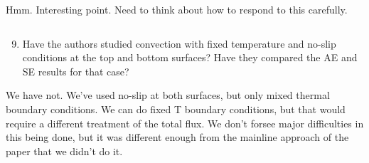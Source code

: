 \documentclass[aps, 11pt, singlecolumn]{revtex4-1} %
\begin{document}
\begin{singlespace}
Hmm. Interesting point. Need to think about how to respond to this carefully.
\begin{myquotation}
$\,$\\\vspace{-1.25cm}
\begin{enumerate}
\setcounter{enumi}{8}
\item Have the authors studied convection with fixed temperature and no-slip conditions at the top and bottom surfaces? Have they compared the AE and SE results for that case?
\end{enumerate}
\end{myquotation}
We have not. We've used no-slip at both surfaces, but only mixed thermal boundary conditions. We can do fixed T boundary conditions, but that would require a different treatment of the total flux.
We don't forsee major difficulties in this being done, but it was different enough
from the mainline approach of the paper that we didn't do it.





\end{singlespace}





\end{document}
